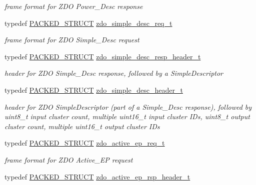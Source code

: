 \begin{DoxyCompactItemize}
\begin{DoxyCompactList}\small\item\em frame format for Z\-D\-O Power\-\_\-\-Desc response \end{DoxyCompactList}\item 
typedef \hyperlink{group___s_x_a_ga4233297bd31be5c273d4fb0758cc54d7}{P\-A\-C\-K\-E\-D\-\_\-\-S\-T\-R\-U\-C\-T} \hyperlink{group__zdo_gaa612a19982dc0c39d207a0662e8a0761}{zdo\-\_\-simple\-\_\-desc\-\_\-req\-\_\-t}
\begin{DoxyCompactList}\small\item\em frame format for Z\-D\-O Simple\-\_\-\-Desc request \end{DoxyCompactList}\item 
typedef \hyperlink{group___s_x_a_ga4233297bd31be5c273d4fb0758cc54d7}{P\-A\-C\-K\-E\-D\-\_\-\-S\-T\-R\-U\-C\-T} \hyperlink{group__zdo_gaee853401cb00e58396b01015a1713f3b}{zdo\-\_\-simple\-\_\-desc\-\_\-resp\-\_\-header\-\_\-t}
\begin{DoxyCompactList}\small\item\em header for Z\-D\-O Simple\-\_\-\-Desc response, followed by a Simple\-Descriptor \end{DoxyCompactList}\item 
typedef \hyperlink{group___s_x_a_ga4233297bd31be5c273d4fb0758cc54d7}{P\-A\-C\-K\-E\-D\-\_\-\-S\-T\-R\-U\-C\-T} \hyperlink{group__zdo_ga2fcb208122b12b93deec95fa934cf40d}{zdo\-\_\-simple\-\_\-desc\-\_\-header\-\_\-t}
\begin{DoxyCompactList}\small\item\em header for Z\-D\-O Simple\-Descriptor (part of a Simple\-\_\-\-Desc response), followed by uint8\-\_\-t input cluster count, multiple uint16\-\_\-t input cluster I\-Ds, uint8\-\_\-t output cluster count, multiple uint16\-\_\-t output cluster I\-Ds \end{DoxyCompactList}\item 
typedef \hyperlink{group___s_x_a_ga4233297bd31be5c273d4fb0758cc54d7}{P\-A\-C\-K\-E\-D\-\_\-\-S\-T\-R\-U\-C\-T} \hyperlink{group__zdo_ga54a6580e6f7572ca6014963d3e03e735}{zdo\-\_\-active\-\_\-ep\-\_\-req\-\_\-t}
\begin{DoxyCompactList}\small\item\em frame format for Z\-D\-O Active\-\_\-\-E\-P request \end{DoxyCompactList}\item 
typedef \hyperlink{group___s_x_a_ga4233297bd31be5c273d4fb0758cc54d7}{P\-A\-C\-K\-E\-D\-\_\-\-S\-T\-R\-U\-C\-T} \hyperlink{group__zdo_ga47a4305044809f1e37b1a88c3232676a}{zdo\-\_\-active\-\_\-ep\-\_\-rsp\-\_\-header\-\_\-t}

\end{DoxyCompactItemize}
